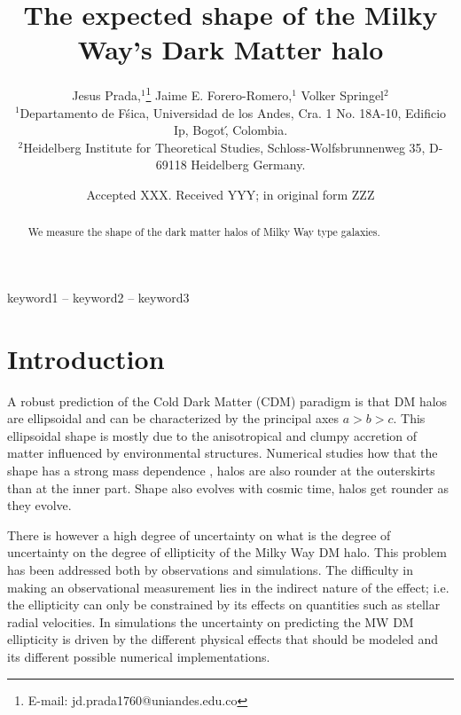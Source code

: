 \documentclass[a4paper,fleqn,usenatbib]{mnras}
\title[MW DM halo shape in AURIGA]{The expected shape of the Milky Way's Dark Matter halo}
\author[Jesus Prada,  Jaime E. Forero-Romero, Volker Springel ]{
Jesus Prada,$^{1}$\thanks{E-mail: jd.prada1760@uniandes.edu.co}
Jaime E. Forero-Romero,$^{1}$
Volker Springel$^{2}$
\\
$^{1}$Departamento de F\'sica, Universidad de los Andes, Cra. 1 No.
18A-10, Edificio Ip, Bogot\', Colombia.\\
$^{2}$Heidelberg Institute for Theoretical Studies, Schloss-Wolfsbrunnenweg 35, D-69118 Heidelberg
Germany.\\
}
\date{Accepted XXX. Received YYY; in original form ZZZ}
\begin{document}
\label{firstpage}
\pagerange{\pageref{firstpage}--\pageref{lastpage}}
\maketitle

\begin{abstract}
We measure the shape of the dark matter halos of Milky Way type galaxies.
\end{abstract}

\begin{keywords}
keyword1 -- keyword2 -- keyword3
\end{keywords}



\section{Introduction}


A robust prediction of the Cold Dark Matter (CDM) paradigm is that DM
halos are ellipsoidal and can be characterized by the principal axes
$a>b>c$.
This ellipsoidal shape is mostly due to the anisotropical and
clumpy accretion of matter influenced by environmental structures.
Numerical studies how that the shape has a strong mass dependence
\citep{Allgood_et_al._2006}, halos are also rounder at the outerskirts
than at the inner part. 
Shape also evolves with cosmic time, halos get
rounder as they evolve.  

There is however a high degree of uncertainty on what is the degree of
uncertainty on the degree of ellipticity of the Milky Way DM halo.
This problem has been addressed both by observations and simulations.
The difficulty in making an observational measurement lies in the
indirect nature of the effect; i.e. the ellipticity can only be
constrained by its effects on quantities such as stellar radial
velocities.
In simulations the uncertainty on predicting the MW DM ellipticity is 
driven by the different physical effects that should be modeled and
its different possible numerical implementations.
\end{document}
